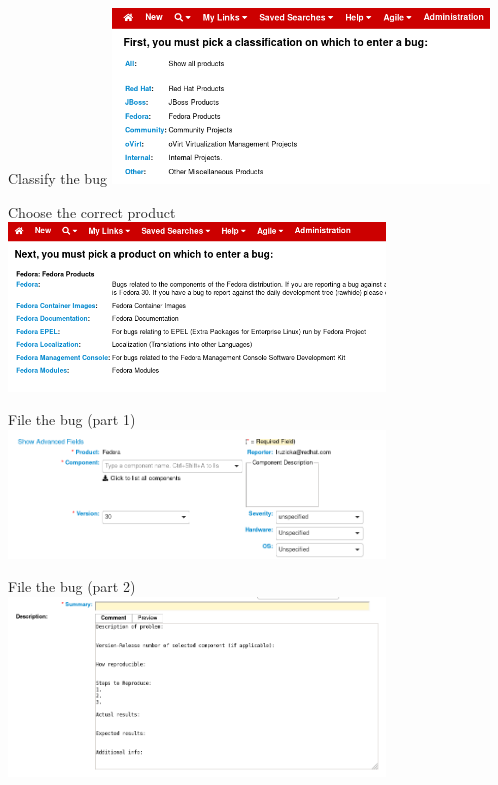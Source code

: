 \documentclass[12pt,aspectratio=169]{beamer}
\begin{document}
\begin{frame}{Classify the bug}
\includegraphics[width=10cm]{images/bz_classification.png}
\end{frame}

\begin{frame}{Choose the correct product}
\includegraphics[width=10cm]{images/bz_product.png}
\end{frame}

\begin{frame}{File the bug (part 1)}
\includegraphics[width=10cm]{images/bz_header.png}
\end{frame}

\begin{frame}{File the bug (part 2)}
\includegraphics[width=10cm]{images/bz_description.png}
\end{frame}
\end{document}
